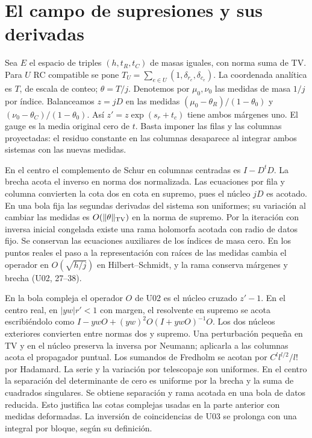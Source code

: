 \section{El campo de supresiones y sus derivadas}
Sea $E$ el espacio de triples $(h,t_R,t_C)$ de masas iguales, con norma suma de TV.
Para $U$ RC compatible se pone $T_U=\sum_{e\in U}(1,\delta_{r_e},\delta_{c_e})$.
La coordenada analítica es $T$, de escala de conteo; $\theta=T/j$.
Denotemos por $\mu_0,\nu_0$ las medidas de masa $1/j$ por índice. Balanceamos $z=jD$
en las medidas $(\mu_0-\theta_R)/(1-\theta_0)$ y $(\nu_0-\theta_C)/(1-\theta_0)$.
Así $z'=z\exp(s_r+t_c)$ tiene ambos márgenes uno. El gauge es la media original
cero de $t$. Basta imponer las filas y las columnas proyectadas: el residuo constante
en las columnas desaparece al integrar ambos sistemas con las nuevas medidas.

En el centro el complemento de Schur en columnas centradas es $I-D^tD$.
La brecha acota el inverso en norma dos normalizada. Las ecuaciones
por fila y columna convierten la cota dos en cota en supremo, pues el núcleo $jD$ es acotado.
En una bola fija las segundas derivadas del sistema son uniformes; su variación al cambiar
las medidas es $O(\|\theta\|_{\rm TV})$ en la norma de supremo. Por la iteración con
inversa inicial congelada existe una rama holomorfa acotada con radio de datos fijo.
Se conservan las ecuaciones auxiliares de los índices de masa cero. En los puntos reales
el paso a la representación con raíces de las medidas cambia el operador en
$O(\sqrt{h/j})$ en Hilbert--Schmidt, y la rama conserva márgenes y brecha (U02, 27--38).

En la bola compleja el operador $O$ de U02 es el núcleo cruzado $z'-1$.
En el centro real, en $|yw|r'<1$ con margen, el resolvente en supremo se acota
escribiéndolo como $I-ywO+(yw)^2 O(I+ywO)^{-1}O$. Los dos núcleos exteriores
convierten entre normas dos y supremo. Una perturbación pequeña en TV y en el núcleo
preserva la inversa por Neumann; aplicarla a las columnas acota el propagador puntual.
Los sumandos de Fredholm se acotan por $C^l l^{l/2}/l!$ por Hadamard.
La serie y la variación por telescopaje son uniformes. En el centro la separación
del determinante de cero es uniforme por la brecha y la suma de cuadrados singulares.
Se obtiene separación y rama acotada en una bola de datos reducida. Esto justifica
las cotas complejas usadas en la parte anterior con medidas deformadas. La inversión de
coincidencias de U03 se prolonga con una integral por bloque, según su definición.

